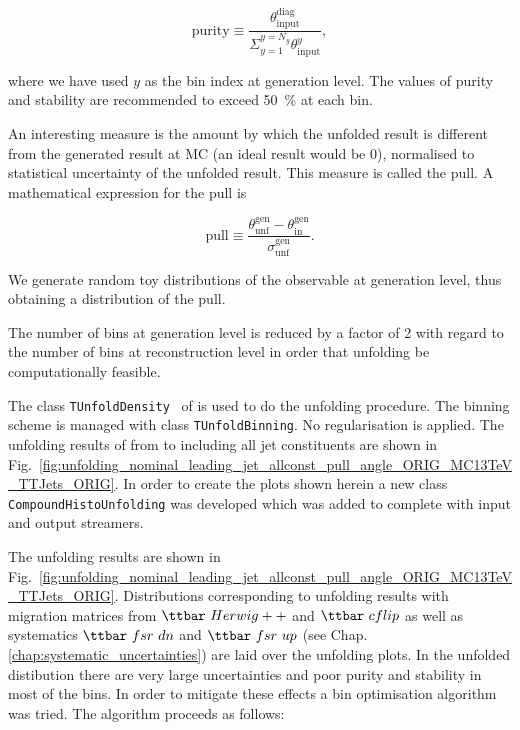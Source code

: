 \begin{equation}
  \text{purity}\equiv\frac{\theta^{\text{diag}}_{\text{input}}}{\Sigma_{y=1}^{y=N_{y}}\theta^{y}_{\text{input}}},
\end{equation}

\noindent where we have used $y$ as the bin index at generation level. The values of purity and stability are recommended to exceed 50~\% at each bin.

An interesting measure is the amount by which the unfolded result is different from the generated result at MC (an ideal result would be 0), normalised to statistical uncertainty of the unfolded result. This measure is called the pull. A mathematical expression for the pull is

\begin{equation}
  \text{pull}\equiv\frac{\theta^{\text{gen}}_{\text{unf}}-\theta^{\text{gen}}_{\text{in}}}{\sigma^{\text{gen}}_{\text{unf}}}.
\end{equation}

We generate random toy distributions of the observable at generation level, thus obtaining a distribution of the pull.

The number of bins at generation level is reduced by a factor of 2 with regard to the number of bins at reconstruction level in order that unfolding be computationally feasible.

The class \lstinline[language=sh]|TUnfoldDensity|~\cite{Schmitt:2012kp} of \ROOT is used to do the unfolding procedure. The binning scheme is managed with class \lstinline[language=sh]|TUnfoldBinning|. No regularisation is applied. The unfolding results of \pullangle from \leadingjet to \scndleadingjet including all jet constituents are shown in Fig.~\ref{fig:unfolding_nominal_leading_jet_allconst_pull_angle_ORIG_MC13TeV_TTJets_ORIG}. In order to create the plots shown herein a new class \lstinline[language=sh]|CompoundHistoUnfolding| \cite{url:compoundhistounfolding} was developed which was added to \ROOT complete with input and output streamers.

The unfolding results are shown in Fig.~\ref{fig:unfolding_nominal_leading_jet_allconst_pull_angle_ORIG_MC13TeV_TTJets_ORIG}. Distributions corresponding to unfolding results with migration matrices from $\ttbar\ Herwig++$ and $\ttbar\ cflip$ as well as systematics $\ttbar\ fsr\ dn$ and $\ttbar\ fsr\ up$ (see Chap. \ref{chap:systematic_uncertainties}) are laid over the unfolding plots. In the unfolded distibution there are very large uncertainties and poor purity and stability in most of the bins. In order to mitigate these effects a bin optimisation algorithm was tried. The algorithm proceeds as follows:

